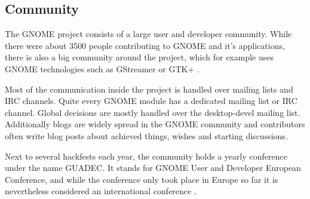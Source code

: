 
\subsection{Community} %
\label{sub:Community}

The GNOME project consists of a large user and developer community. While there
were about 3500 people contributing to GNOME and it's applications, there is
also a big community around the project, which for example uses GNOME
technologies such as GStreamer or GTK+ \cite{GNOMEAbout,GNOMETeams}.

Most of the communication inside the project is handled over mailing lists and
\ac{IRC} channels. Quite every GNOME module has a dedicated mailing list or
\ac{IRC} channel. Global decisions are mostly handled over the desktop-devel
mailing list. Additionally blogs are widely spread in the GNOME community and
contributors often write blog posts about achieved things, wishes and starting
discussions.

Next to several hackfests each year, the community holds a yearly conference
under the name GUADEC. It stands for GNOME User and Developer European
Conference, and while the conference only took place in Europe so far it is
nevertheless considered an international conference \cite{GNOMEGUADEC}.

